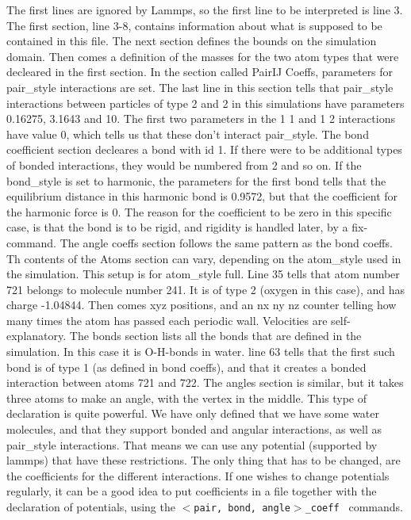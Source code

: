 The first lines are ignored by Lammps, so the first line to be interpreted is line 3. The first section, line 3-8, contains information about what is supposed to be contained in this file. The next section defines the bounds on the simulation domain. Then comes a definition of the masses for the two atom types that were decleared in the first section. In the section called PairIJ Coeffs, parameters for pair\_style interactions are set. The last line in this section tells that pair\_style interactions between particles of type 2 and 2 in this simulations have parameters 0.16275, 3.1643 and 10. The first two parameters in the 1 1 and 1 2 interactions have value 0, which tells us that these don't interact pair\_style. The bond coefficient section decleares a bond with id 1. If there were to be additional types of bonded interactions, they would be numbered from 2 and so on. If the bond\_style is set to harmonic, the parameters for the first bond tells that the equilibrium distance in this harmonic bond is 0.9572, but that the coefficient for the harmonic force is 0. The reason for the coefficient to be zero in this specific case, is that the bond is to be rigid, and rigidity is handled later, by a fix-command. The angle coeffs section follows the same pattern as the bond coeffs. Th contents of the Atoms section can vary, depending on the atom\_style used in the simulation. This setup is for atom\_style full. Line 35 tells that atom number 721 belongs to molecule number 241. It is of type 2 (oxygen in this case), and has charge -1.04844. Then comes xyz positions, and an nx ny nz counter telling how many times the atom has passed each periodic wall. Velocities are self-explanatory. The bonds section lists all the bonds that are defined in the simulation. In this case it is O-H-bonds in water. line 63 tells that the first such bond is of type 1 (as defined in bond coeffs), and that it creates a bonded interaction between atoms 721 and 722. The angles section is similar, but it takes three atoms to make an angle, with the vertex in the middle. This type of declaration is quite powerful. We have only defined that we have some water molecules, and that they support bonded and angular interactions, as well as pair\_style interactions. That means we can use any potential (supported by lammps) that have these restrictions. The only thing that has to be changed, are the coefficients for the different interactions. If one wishes to change potentials regularly, it can be a good idea to put coefficients in a file together with the declaration of potentials, using the {\tt $<$pair, bond, angle$>$\_coeff } commands. 

